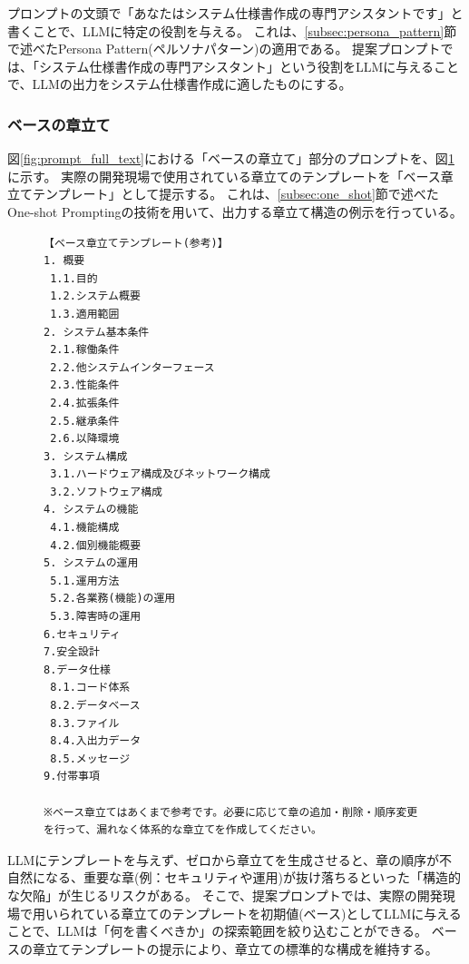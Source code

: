 プロンプトの文頭で「あなたはシステム仕様書作成の専門アシスタントです」と書くことで、LLMに特定の役割を与える。
これは、\ref{subsec:persona_pattern}節で述べたPersona Pattern(ペルソナパターン)の適用である。
提案プロンプトでは、「システム仕様書作成の専門アシスタント」という役割をLLMに与えることで、LLMの出力をシステム仕様書作成に適したものにする。

\subsubsection{ベースの章立て}

図\ref{fig:prompt_full_text}における「ベースの章立て」部分のプロンプトを、図\ref{fig:base_outline}に示す。
実際の開発現場で使用されている章立てのテンプレートを「ベース章立てテンプレート」として提示する。
これは、\ref{subsec:one_shot}節で述べたOne-shot Promptingの技術を用いて、出力する章立て構造の例示を行っている。



\begin{figure}[tp]
\begin{tcolorbox}[
  colback=white,
  colframe=blue,
  fonttitle=\bfseries,
]
\footnotesize
\ttfamily
\fontsize{9}{10}\selectfont
\begin{verbatim}
【ベース章立てテンプレート(参考)】
1. 概要
 1.1.目的
 1.2.システム概要
 1.3.適用範囲
2. システム基本条件
 2.1.稼働条件
 2.2.他システムインターフェース
 2.3.性能条件
 2.4.拡張条件
 2.5.継承条件
 2.6.以降環境
3. システム構成
 3.1.ハードウェア構成及びネットワーク構成
 3.2.ソフトウェア構成
4. システムの機能
 4.1.機能構成
 4.2.個別機能概要
5. システムの運用
 5.1.運用方法
 5.2.各業務(機能)の運用
 5.3.障害時の運用
6.セキュリティ
7.安全設計
8.データ仕様
 8.1.コード体系
 8.2.データベース
 8.3.ファイル
 8.4.入出力データ
 8.5.メッセージ
9.付帯事項

※ベース章立てはあくまで参考です。必要に応じて章の追加・削除・順序変更を行って、漏れなく体系的な章立てを作成してください。
\end{verbatim}
\end{tcolorbox}
\par\vspace{-20pt}
\label{fig:base_outline}
\end{figure}


LLMにテンプレートを与えず、ゼロから章立てを生成させると、章の順序が不自然になる、重要な章(例：セキュリティや運用)が抜け落ちるといった「構造的な欠陥」が生じるリスクがある。
そこで、提案プロンプトでは、実際の開発現場で用いられている章立てのテンプレートを初期値(ベース)としてLLMに与えることで、LLMは「何を書くべきか」の探索範囲を絞り込むことができる。
ベースの章立てテンプレートの提示により、章立ての標準的な構成を維持する。


